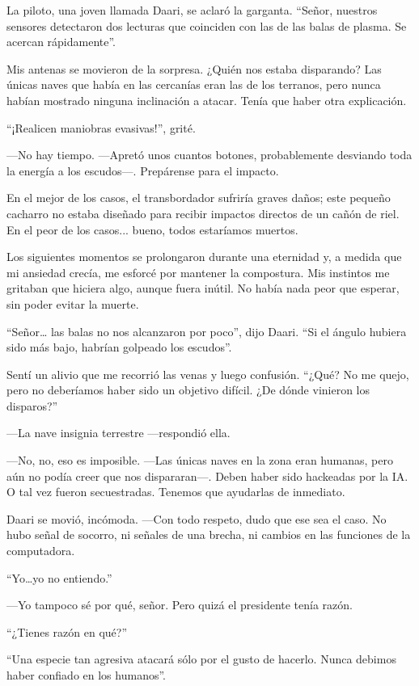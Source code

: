 La piloto, una joven llamada Daari, se aclaró la garganta. ``Señor, nuestros sensores detectaron dos lecturas que coinciden con las de las balas de plasma. Se acercan rápidamente''.

Mis antenas se movieron de la sorpresa. ¿Quién nos estaba disparando? Las únicas naves que había en las cercanías eran las de los terranos, pero nunca habían mostrado ninguna inclinación a atacar. Tenía que haber otra explicación.

``¡Realicen maniobras evasivas!'', grité.

—No hay tiempo. —Apretó unos cuantos botones, probablemente desviando toda la energía a los escudos—. Prepárense para el impacto.

En el mejor de los casos, el transbordador sufriría graves daños; este pequeño cacharro no estaba diseñado para recibir impactos directos de un cañón de riel. En el peor de los casos... bueno, todos estaríamos muertos.

Los siguientes momentos se prolongaron durante una eternidad y, a medida que mi ansiedad crecía, me esforcé por mantener la compostura. Mis instintos me gritaban que hiciera algo, aunque fuera inútil. No había nada peor que esperar, sin poder evitar la muerte.

``Señor… las balas no nos alcanzaron por poco'', dijo Daari. ``Si el ángulo hubiera sido más bajo, habrían golpeado los escudos''.

Sentí un alivio que me recorrió las venas y luego confusión. ``¿Qué? No me quejo, pero no deberíamos haber sido un objetivo difícil. ¿De dónde vinieron los disparos?''

—La nave insignia terrestre —respondió ella.

—No, no, eso es imposible. —Las únicas naves en la zona eran humanas, pero aún no podía creer que nos dispararan—. Deben haber sido hackeadas por la IA. O tal vez fueron secuestradas. Tenemos que ayudarlas de inmediato.

Daari se movió, incómoda. —Con todo respeto, dudo que ese sea el caso. No hubo señal de socorro, ni señales de una brecha, ni cambios en las funciones de la computadora.

``Yo…yo no entiendo.''

—Yo tampoco sé por qué, señor. Pero quizá el presidente tenía razón.

``¿Tienes razón en qué?''

``Una especie tan agresiva atacará sólo por el gusto de hacerlo. Nunca debimos haber confiado en los humanos''.


